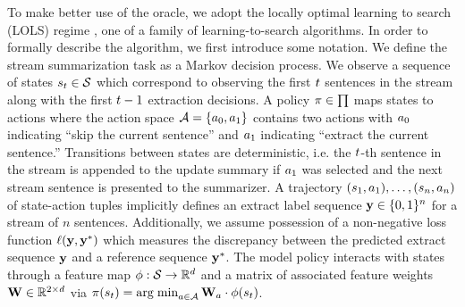 To make better use of the oracle, we adopt the locally optimal learning to
search (LOLS) regime \citep{chang2015learning}, one of a family of 
learning-to-search algorithms. In order to formally describe the algorithm, we
first introduce some notation. We define the stream summarization task as a 
Markov decision process. We observe a sequence of states $s_t \in 
\mathcal{S}$ which correspond to observing the first $t$ sentences in 
the stream along with the first $t-1$ extraction decisions. A policy 
$\pi \in \prod$ maps states to
actions where the action space $\mathcal{A} = \{a_0, a_1\}$ contains two 
actions with $a_0$ indicating ``skip the current sentence'' and 
$a_1$ 
indicating ``extract the current sentence.'' 
Transitions between states are deterministic, i.e. the $t$-th 
sentence in the stream is appended to the update summary if $a_1$
was selected and the next stream sentence is presented to the summarizer.
A trajectory $(s_1, a_1), \ldots, (s_n, a_n)$
of state-action tuples
implicitly defines an extract label sequence $\mathbf{y} \in \{0, 1\}^n$
for a stream of $n$ sentences.
Additionally, we assume possession of a non-negative loss function 
$\ell(\mathbf{y}, \mathbf{y}^*)$
which measures the discrepancy between the predicted extract sequence 
$\mathbf{y}$ and a reference sequence $\mathbf{y}^*$.
The model policy interacts with states through a feature
map $\phi : \mathcal{S} \rightarrow \mathbb{R}^{d}$ and a matrix 
of associated feature
weights $\mathbf{W}\in \mathbb{R}^{2 \times d}$ via $\pi(s_t)
= \operatorname{arg\; min}_{a \in \mathcal{A}} 
    \mathbf{W}_a \cdot \phi(s_t)$.


